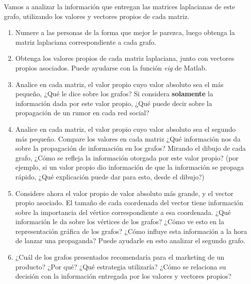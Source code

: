 \documentclass[a4paper]{article}
\begin{document}
Vamos a analizar la información que entregan las matrices laplacianas de este grafo, utilizando los valores y vectores propios de cada matriz.

\begin{enumerate}
    \item Numere a las personas de la forma que mejor le parezca, luego obtenga la matriz laplaciana correspondiente a cada grafo.
    
    \item Obtenga los valores propios de cada matriz laplaciana, junto con vectores propios asociados. Puede ayudarse con la función \textit{eig} de Matlab.

    \item Analice en cada matriz, el valor propio cuyo valor absoluto sea el más pequeño, ¿Qué le dice sobre los grafos? Si considera \textbf{solamente} la información dada por este valor propio, ¿Qué puede decir sobre la propagación de un rumor en cada red social?

    \item Analice en cada matriz, el valor propio cuyo valor absoluto sea el segundo más pequeño. Compare los valores en cada matriz ¿Qué información nos da sobre la propagación de información en los grafos? Mirando el dibujo de cada grafo, ¿Cómo se refleja la información otorgada por este valor propio? (por ejemplo, si un valor propio dio información de que la información se propaga rápido, ¿Qué explicación puede dar para esto, desde el dibujo?)

    \item Considere ahora el valor propio de valor absoluto más grande, y el vector propio asociado. El tamaño de cada coordenada del vector tiene información sobre la importancia del vértice correspondiente a esa coordenada. ¿Qué información le da sobre los vértices de los grafos? ¿Cómo ve esto en la representación gráfica de los grafos? ¿Cómo influye esta información a la hora de lanzar una propaganda? Puede ayudarle en esto analizar el segundo grafo. 
    
    \item ¿Cuál de los grafos presentados recomendaría para el marketing de un producto? ¿Por qué? ¿Qué estrategia utilizaría? ¿Cómo se relaciona su decisión con la información entregada por los valores y vectores propios?

    
\end{enumerate}
\end{document}
